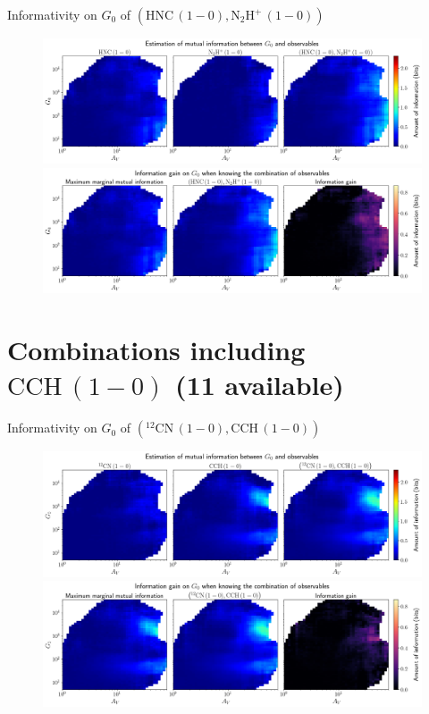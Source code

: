 \documentclass{beamer}
\begin{document}
\begin{frame}{Informativity on $G_0$ of $\left(\mathrm{HNC\,(1-0)},\mathrm{N_2H^+\,(1-0)}\right)$}
    \begin{figure}
        \centering
        \includegraphics[width=0.95\linewidth]{../mi/g0__hnc10_n2hp10_mi.png}
        \vfill
        \includegraphics[width=0.95\linewidth]{../mi/g0__hnc10_n2hp10_mi_gain.png}
    \end{figure}
\end{frame}

\section{Combinations including $\mathrm{CCH\,(1-0)}$ (11 available)}

\begin{frame}{Informativity on $G_0$ of $\left(\mathrm{^{12}CN\,(1-0)},\mathrm{CCH\,(1-0)}\right)$}
    \begin{figure}
        \centering
        \includegraphics[width=0.95\linewidth]{../mi/g0__12cn10_cch10_mi.png}
        \vfill
        \includegraphics[width=0.95\linewidth]{../mi/g0__12cn10_cch10_mi_gain.png}
    \end{figure}
\end{frame}
\end{document}
